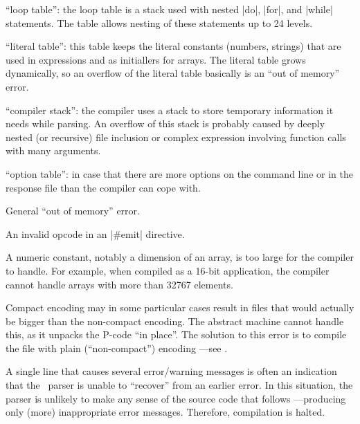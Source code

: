 {{        ``loop table'': the loop table is a stack used with nested |do|, |for|,
        and |while| statements. The table allows nesting of these statements
        up to 24 levels.

        ``literal table'': this table keeps the literal constants (numbers,
        strings) that are used in expressions and as initiallers for arrays.
        The literal table grows dynamically, so an overflow of the literal
        table basically is an ``out of memory'' error.

        ``compiler stack'': the compiler uses a stack to store temporary
        information it needs while parsing. An overflow of this stack is
        probably caused by deeply nested (or recursive) file inclusion or
        complex expression involving function calls with many arguments.

        ``option table'': in case that there are more options on the command
        line or in the response file than the compiler can cope with.

 
        General ``out of memory'' error.

 
        An invalid opcode in an |#emit| directive.

 
        A numeric constant, notably a dimension of an array, is too large for
        the compiler to handle. For example, when compiled as a 16-bit
        application, the compiler cannot handle arrays with more than 32767
        elements.

  
        Compact encoding may in some particular cases result in files that would
        actually be bigger than the non-compact encoding. The abstract machine
        cannot handle this, as it unpacks the P-code ``in place''. The solution
        to this error is to compile the file with plain (``non-compact'') encoding
        ---see .

 
        A single line that causes several error\slash warning messages is
        often an indication that the \Small\ parser is unable to ``recover''
        from an earlier error. In this situation, the parser is unlikely to
        make any sense of the source code that follows ---producing only (more)
        inappropriate error messages. Therefore, compilation is halted.
\endlist
{}


}}
